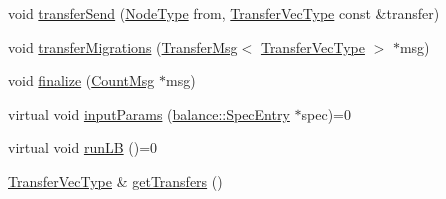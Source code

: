 \begin{DoxyCompactItemize}
\item 
void \hyperlink{structvt_1_1vrt_1_1collection_1_1lb_1_1_base_l_b_af8d95bc056659de7121bca99ce2d9d73}{transfer\+Send} (\hyperlink{namespacevt_a866da9d0efc19c0a1ce79e9e492f47e2}{Node\+Type} from, \hyperlink{structvt_1_1vrt_1_1collection_1_1lb_1_1_base_l_b_a329e8179ec41a1bd4924c79fe23a79af}{Transfer\+Vec\+Type} const \&transfer)
\item 
void \hyperlink{structvt_1_1vrt_1_1collection_1_1lb_1_1_base_l_b_adb9e1197bc690340bc1a4a6c77ac5254}{transfer\+Migrations} (\hyperlink{structvt_1_1vrt_1_1collection_1_1lb_1_1_transfer_msg}{Transfer\+Msg}$<$ \hyperlink{structvt_1_1vrt_1_1collection_1_1lb_1_1_base_l_b_a329e8179ec41a1bd4924c79fe23a79af}{Transfer\+Vec\+Type} $>$ $\ast$msg)
\item 
void \hyperlink{structvt_1_1vrt_1_1collection_1_1lb_1_1_base_l_b_a66f2b22d12492c145a3d567ebd67194b}{finalize} (\hyperlink{structvt_1_1vrt_1_1collection_1_1lb_1_1_count_msg}{Count\+Msg} $\ast$msg)
\item 
virtual void \hyperlink{structvt_1_1vrt_1_1collection_1_1lb_1_1_base_l_b_a555e29aadfd428383464d6dd007506b6}{input\+Params} (\hyperlink{structvt_1_1vrt_1_1collection_1_1balance_1_1_spec_entry}{balance\+::\+Spec\+Entry} $\ast$spec)=0
\item 
virtual void \hyperlink{structvt_1_1vrt_1_1collection_1_1lb_1_1_base_l_b_a69a398c54f8129f365171a1189ffcd84}{run\+LB} ()=0
\item 
\hyperlink{structvt_1_1vrt_1_1collection_1_1lb_1_1_base_l_b_a329e8179ec41a1bd4924c79fe23a79af}{Transfer\+Vec\+Type} \& \hyperlink{structvt_1_1vrt_1_1collection_1_1lb_1_1_base_l_b_ace9ba67a70c21b1198feee35827eea11}{get\+Transfers} ()
\end{DoxyCompactItemize}
